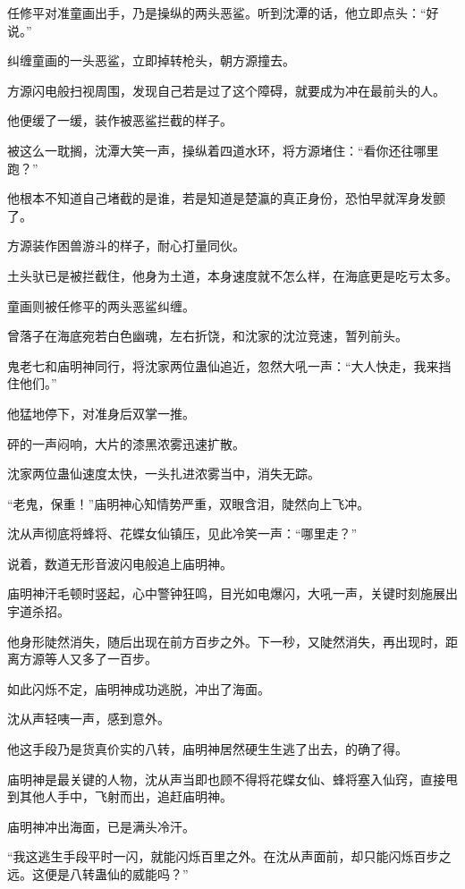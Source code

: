 \begin{this_body}
任修平对准童画出手，乃是操纵的两头恶鲨。听到沈潭的话，他立即点头：“好说。”

纠缠童画的一头恶鲨，立即掉转枪头，朝方源撞去。

方源闪电般扫视周围，发现自己若是过了这个障碍，就要成为冲在最前头的人。

他便缓了一缓，装作被恶鲨拦截的样子。

被这么一耽搁，沈潭大笑一声，操纵着四道水环，将方源堵住：“看你还往哪里跑？”

他根本不知道自己堵截的是谁，若是知道是楚瀛的真正身份，恐怕早就浑身发颤了。

方源装作困兽游斗的样子，耐心打量同伙。

土头驮已是被拦截住，他身为土道，本身速度就不怎么样，在海底更是吃亏太多。

童画则被任修平的两头恶鲨纠缠。

曾落子在海底宛若白色幽魂，左右折饶，和沈家的沈泣竞速，暂列前头。

鬼老七和庙明神同行，将沈家两位蛊仙追近，忽然大吼一声：“大人快走，我来挡住他们。”

他猛地停下，对准身后双掌一推。

砰的一声闷响，大片的漆黑浓雾迅速扩散。

沈家两位蛊仙速度太快，一头扎进浓雾当中，消失无踪。

“老鬼，保重！”庙明神心知情势严重，双眼含泪，陡然向上飞冲。

沈从声彻底将蜂将、花蝶女仙镇压，见此冷笑一声：“哪里走？”

说着，数道无形音波闪电般追上庙明神。

庙明神汗毛顿时竖起，心中警钟狂鸣，目光如电爆闪，大吼一声，关键时刻施展出宇道杀招。

他身形陡然消失，随后出现在前方百步之外。下一秒，又陡然消失，再出现时，距离方源等人又多了一百步。

如此闪烁不定，庙明神成功逃脱，冲出了海面。

沈从声轻咦一声，感到意外。

他这手段乃是货真价实的八转，庙明神居然硬生生逃了出去，的确了得。

庙明神是最关键的人物，沈从声当即也顾不得将花蝶女仙、蜂将塞入仙窍，直接甩到其他人手中，飞射而出，追赶庙明神。

庙明神冲出海面，已是满头冷汗。

“我这逃生手段平时一闪，就能闪烁百里之外。在沈从声面前，却只能闪烁百步之远。这便是八转蛊仙的威能吗？”


\end{this_body}
